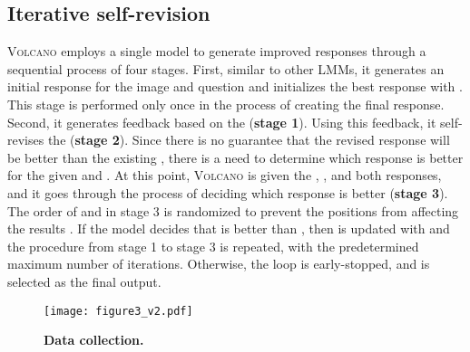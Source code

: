 \documentclass[11pt]{article}
\newcommand{\Ours}{\textsc{Volcano}}
\begin{document}
\subsection{Iterative self-revision}
\label{subsec:iterative}
{\Ours} employs a single model to generate improved responses through a sequential process of four stages. First, similar to other LMMs, it generates an initial response  for the image  and question  and initializes the best response  with . This stage is performed only once in the process of creating the final response. Second, it generates feedback  based on the  (\textbf{stage 1}). Using this feedback, it self-revises the  (\textbf{stage 2}). Since there is no guarantee that the revised response  will be better than the existing , there is a need to determine which response is better for the given  and . At this point, {\Ours} is given the , , and both responses, and it goes through the process of deciding which response is better (\textbf{stage 3}). The order of  and  in stage 3 is randomized to prevent the positions from affecting the results \citep{wang2023large}. If the model decides that  is better than , then  is updated with  and the procedure from stage 1 to stage 3 is repeated, with the predetermined maximum number of iterations. Otherwise, the loop is early-stopped, and  is selected as the final output. 
\begin{figure}[h!]
\texttt{[image: figure3\_v2.pdf]}
\caption{\textbf{Data collection.}}
\label{fig:figure3}
\end{figure}
\end{document}
